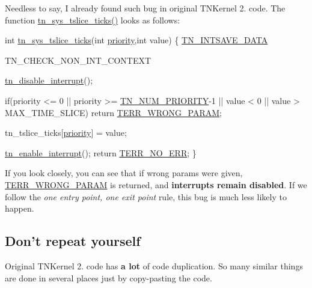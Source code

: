 Needless to say, I already found such bug in original T\+N\+Kernel 2. code. The function {\ttfamily \hyperlink{tn__oldsymbols_8h_a74b0cfd9bbf5a85f4e0d00a984f60f5e}{tn\+\_\+sys\+\_\+tslice\+\_\+ticks()}} looks as follows\+:


\begin{DoxyCode}
\textcolor{keywordtype}{int} \hyperlink{tn__oldsymbols_8h_a74b0cfd9bbf5a85f4e0d00a984f60f5e}{tn\_sys\_tslice\_ticks}(\textcolor{keywordtype}{int} \hyperlink{structTN__Task_a43c9c73249da8faa1177587786c40616}{priority},\textcolor{keywordtype}{int} value)
\{
   \hyperlink{tn__arch__example_8h_a58899c98640384b8a2cf7f9ba6f53a23}{TN\_INTSAVE\_DATA}

   TN\_CHECK\_NON\_INT\_CONTEXT

   \hyperlink{tn__oldsymbols_8h_a27bf94f93625fa36125c3fa3ae6b4041}{tn\_disable\_interrupt}();

   \textcolor{keywordflow}{if}(priority <= 0 || priority >= \hyperlink{tn__oldsymbols_8h_a63b4da81df067abd19fe86f5712a34e3}{TN\_NUM\_PRIORITY}-1 ||
                                value < 0 || value > MAX\_TIME\_SLICE)
      \textcolor{keywordflow}{return} \hyperlink{tn__oldsymbols_8h_a35ec519d54f884d84c5814f49f00a22b}{TERR\_WRONG\_PARAM};

   tn\_tslice\_ticks[\hyperlink{structTN__Task_a43c9c73249da8faa1177587786c40616}{priority}] = value;

   \hyperlink{tn__oldsymbols_8h_acc85567ca09ede9cf2d58717506def46}{tn\_enable\_interrupt}();
   \textcolor{keywordflow}{return} \hyperlink{tn__oldsymbols_8h_a71970f860643e62fad7ec03076bdc1d8}{TERR\_NO\_ERR};
\}
\end{DoxyCode}


If you look closely, you can see that if wrong params were given, {\ttfamily \hyperlink{tn__oldsymbols_8h_a35ec519d54f884d84c5814f49f00a22b}{T\+E\+R\+R\+\_\+\+W\+R\+O\+N\+G\+\_\+\+P\+A\+R\+A\+M}} is returned, and {\bfseries interrupts remain disabled}. If we follow the {\itshape one entry point, one exit point} rule, this bug is much less likely to happen.\hypertarget{why_reimplement_why_reimplement__dont_repeat_yourself}{}\subsection{Don't repeat yourself}\label{why_reimplement_why_reimplement__dont_repeat_yourself}
Original T\+N\+Kernel 2. code has {\bfseries a lot} of code duplication. So many similar things are done in several places just by copy-\/pasting the code.


